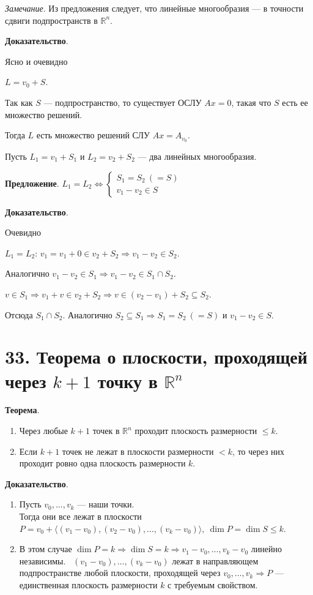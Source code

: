 \documentclass[a4paper, 12pt]{article}
\newcommand{\R}{\mathbb{R}}
\newcommand*\circled[1]{\tikz[baseline=(char.base)]{
        \node[shape=circle,draw,inner sep=1.5pt] (char) {#1};}}
\begin{document}
\textit{Замечание}. Из предложения следует, что линейные многообразия --- в точности сдвиги подпространств в $\R^n$.

\textbf{Доказательство}.

\circled{$\Rightarrow$} Ясно и очевидно

\circled{$\Leftarrow$} $L = v_0 + S$.

Так как $S$ --- подпространство, то существует ОСЛУ $Ax = 0$, такая что $S$ есть ее множество решений.

Тогда $L$ есть множество решений СЛУ $Ax = A_{v_0}$.

\vspace{5mm}
Пусть $L_1 = v_1 + S_1$ и $L_2 =v_2 + S_2$ --- два линейных многообразия.

\textbf{Предложение}. $L_1 = L_2 \Longleftrightarrow 
\begin{cases*}
S_1 = S_2\ (= S) \\
v_1 - v_2 \in S
\end{cases*}$

\textbf{Доказательство}.

\circled{$\Leftarrow$} Очевидно

\circled{$\Rightarrow$} $L_1 = L_2$: $v_1 = v_1 + 0 \in v_2 + S_2 \Rightarrow v_1 - v_2 \in S_2$.

Аналогично $v_1 - v_2 \in S_1 \Rightarrow v_1 - v_2 \in S_1 \cap S_2$.

$v \in S_1 \Rightarrow v_1 + v \in v_2 + S_2 \Rightarrow v \in (v_2 - v_1) + S_2 \subseteq S_2$.

Отсюда $S_1 \cap S_2$. Аналогично $S_2 \subseteq S_1 \Longrightarrow S_1 = S_2\ (= S)$ и $v_1 - v_2 \in S$.

\section*{33. Теорема о плоскости, проходящей через $k + 1$ точку в $\R^n$}
\textbf{Теорема}.
\begin{enumerate}
\itemsep=0em
\item Через любые $k + 1$ точек в $\R^n$ проходит плоскость размерности $\leqslant k$.
\item Если $k + 1$ точек не лежат в плоскости размерности $< k$, то через них проходит ровно одна плоскость размерности $k$.
\end{enumerate}

\textbf{Доказательство}.
\vspace{-3mm}
\begin{enumerate}
\itemsep=0em
\item Пусть $v_0, \ldots, v_k$ --- наши точки. \\
Тогда они все лежат в плоскости $P = v_0 + \langle (v_1 - v_0), (v_2 - v_0), \ldots, (v_k - v_0) \rangle,\ \dim P = \dim S \leqslant k$.
\item В этом случае $\dim P = k \Longrightarrow \dim S = k \Longrightarrow v_1 - v_0, \ldots, v_k - v_0$ линейно независимы. \
$(v_1 - v_0), \ldots, (v_k - v_0)$ лежат в направляющем подпространстве любой плоскости, проходящей через $v_0, \ldots, v_k \Longrightarrow P$ --- единственная плоскость размерности $k$ с требуемым свойством.
\end{enumerate}
\end{document}
